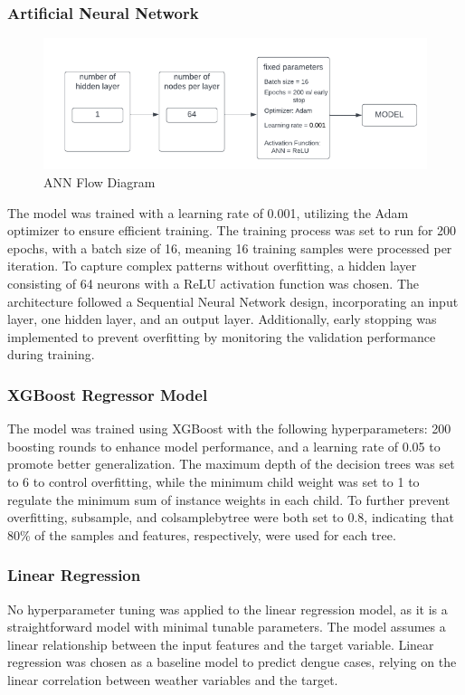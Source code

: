 \documentclass[runningheads]{llncs}
\begin{document}
\subsubsection{Artificial Neural Network}
\begin{figure}[h!]
	\centering
	\includegraphics[width=1\linewidth]{image/ANN diagram.png}
	\caption{ANN Flow Diagram}
	\label{fig:annflow}
\end{figure}
The model was trained with a learning rate of 0.001, utilizing the Adam optimizer to ensure efficient training. The training process was set to run for 200 epochs, with a batch size of 16, meaning 16 training samples were processed per iteration. To capture complex patterns without overfitting, a hidden layer consisting of 64 neurons with a ReLU activation function was chosen. The architecture followed a Sequential Neural Network design, incorporating an input layer, one hidden layer, and an output layer. Additionally, early stopping was implemented to prevent overfitting by monitoring the validation performance during training.

\subsubsection{XGBoost Regressor Model}
The model was trained using XGBoost with the following hyperparameters: 200 boosting rounds to enhance model performance, and a learning rate of 0.05 to promote better generalization. The maximum depth of the decision trees was set to 6 to control overfitting, while the minimum child weight was set to 1 to regulate the minimum sum of instance weights in each child. To further prevent overfitting, subsample, and colsamplebytree were both set to 0.8, indicating that 80\% of the samples and features, respectively, were used for each tree. 

\subsubsection{Linear Regression}
No hyperparameter tuning was applied to the linear regression model, as it is a straightforward model with minimal tunable parameters. The model assumes a linear relationship between the input features and the target variable. Linear regression was chosen as a baseline model to predict dengue cases, relying on the linear correlation between weather variables and the target. 
\end{document}
